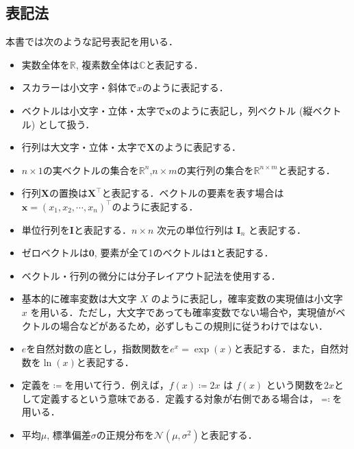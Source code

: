 \subsection{表記法}
本書では次のような記号表記を用いる．
\begin{itemize}
\item 実数全体を$\mathbb{R}$, 複素数全体は$\mathbb{C}$と表記する．
\item スカラーは小文字・斜体で$x$のように表記する．
\item ベクトルは小文字・立体・太字で$\mathbf{x}$のように表記し，列ベクトル (縦ベクトル) として扱う．
\item 行列は大文字・立体・太字で$\mathbf{X}$のように表記する．
\item $n\times 1$の実ベクトルの集合を$\mathbb{R}^n$,$n\times m$の実行列の集合を$\mathbb{R}^{n\times m}$と表記する．
\item 行列$\mathbf{X}$の置換は$\mathbf{X}^\top$と表記する．ベクトルの要素を表す場合は$\mathbf{x} = (x_1, x_2,\cdots, x_n)^\top$のように表記する．
\item 単位行列を$\mathbf{I}$と表記する．$n \times n$ 次元の単位行列は $\mathbf{I}_n$ と表記する．
\item ゼロベクトルは$\mathbf{0}$, 要素が全て1のベクトルは$\mathbf{1}$と表記する．
\item ベクトル・行列の微分には分子レイアウト記法を使用する．
\item 基本的に確率変数は大文字 $X$ のように表記し，確率変数の実現値は小文字 $x$ を用いる．ただし，大文字であっても確率変数でない場合や，実現値がベクトルの場合などがあるため，必ずしもこの規則に従うわけではない．
\item $e$を自然対数の底とし，指数関数を$e^x=\exp(x)$と表記する．また，自然対数を$\ln(x)$と表記する．
\item 定義を$\coloneqq$を用いて行う．例えば，$f(x)\coloneqq2x$ は $f(x)$ という関数を$2x$として定義するという意味である．定義する対象が右側である場合は，$\eqqcolon$を用いる．
\item 平均$\mu$, 標準偏差$\sigma$の正規分布を$\mathcal{N}(\mu, \sigma^2)$と表記する．
\end{itemize}
